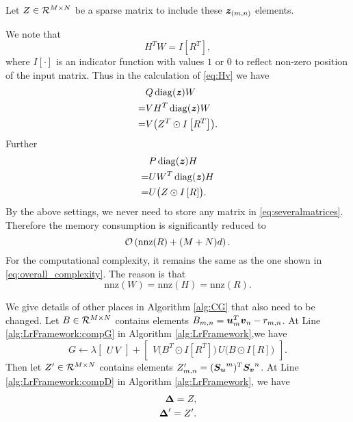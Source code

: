 Let $Z \in \mathcal R^{M \times N}$ be a sparse matrix to include these $\textbf{\textit{z}}_{(m,n)}$ elements.
\par We note that 
\begin{equation*}
H^TW = I\left[R^T\right],
\end{equation*}
where $I\left[ \cdot \right]$ is an indicator function with values $1$ or $0$ to reflect non-zero position of the input matrix. Thus in the calculation of \eqref{eq:Hv} we have 
\begin{equation*}
\begin{aligned}
&Q \operatorname*{diag}(\textbf{\textit{z}}) W \\
=& VH^T \operatorname*{diag}(\textbf{\textit{z}}) W\\
=& V \bigl( Z^T \odot I\left[R^T\right] \bigr).
\end{aligned}
\end{equation*}
Further
\begin{equation*}
\begin{aligned}
&P \operatorname*{diag}(\textbf{\textit{z}}) H \\
=& UW^T \operatorname*{diag}(\textbf{\textit{z}}) H\\
=& U \bigl( Z \odot I\left[R\right] \bigr).
\end{aligned}
\end{equation*}
By the above settings, we never need to store any matrix in \eqref{eq:severalmatrices}. Therefore the memory consumption is significantly reduced to 
\begin{equation*}
 \mathcal{O}\left(\text{nnz}(R)+(M+N)d\right).
\end{equation*}
For the computational complexity, it remains the same as the one shown in \eqref{eq:overall_complexity}. The reason is that 
\begin{equation*}
\text{nnz}(W)=\text{nnz}(H)= \text{nnz}(R).
\label{eq:nnzWnnzHnnzR}
\end{equation*}
\par We give details of other places in Algorithm \ref{alg:CG} that also need to be changed.
Let $B \in \mathcal R^{M \times N}$ contains elements $B_{m,n} = \boldsymbol{u}_m^T \boldsymbol{v}_n - r_{m,n}$.
At Line \ref{alg:LrFramework:compG} in Algorithm \ref{alg:LrFramework},we have
\begin{equation*}
G \gets \lambda \begin{bmatrix} U \, V \end{bmatrix} + \begin{bmatrix} V \bigl( B^T \odot I\left[R^T\right] \bigr) \, U \bigl( B \odot I\left[R\right] \bigr) \end{bmatrix}.
\end{equation*}
Then let $Z^\prime \in \mathcal R^{M \times N}$ contains elements $Z^\prime_{m,n} = (\boldsymbol{S_u}^m)^T \boldsymbol{S_v}^n$.
At Line \ref{alg:LrFramework:compD} in Algorithm \ref{alg:LrFramework}, we have
\begin{align*}
\boldsymbol{\Delta} = Z,\\
\boldsymbol{\Delta}^\prime = Z^\prime.
\end{align*}
